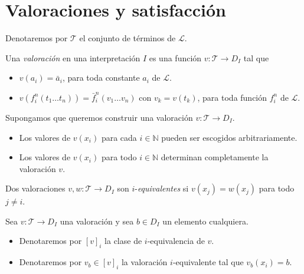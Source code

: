 \chapter{Valoraciones y satisfacción}

\begin{notation}
Denotaremos por $\mathscr T$ el conjunto de términos de $\mathscr L$.
\end{notation}

\begin{definition}
Una \textit{valoración} en una interpretación $I$ es una función $v : \mathscr T \to D_I$ tal que
\begin{itemize}
    \item $v(a_i) = \bar a_i$, para toda constante $a_i$ de $\mathscr L$.
    \item $v(f_i^n(t_1 \dots t_n)) = \bar f_i^n(v_1 \dots v_n)$ con $v_k = v(t_k)$, para toda función $f_i^n$ de $\mathscr L$.
\end{itemize}
\end{definition}

\begin{remarks}
Supongamos que queremos construir una valoración $v : \mathscr T \to D_I$.
\begin{itemize}
    \item Los valores de $v(x_i)$ para cada $i \in \mathbb N$ pueden ser escogidos arbitrariamente.
    \item Los valores de $v(x_i)$ para todo $i \in \mathbb N$ determinan completamente la valoración $v$.
\end{itemize}
\end{remarks}

\begin{definition}
Dos valoraciones $v, w : \mathscr T \to D_I$ son $i$-\textit{equivalentes} si $v(x_j) = w(x_j)$ para todo $j \ne i$.
\end{definition}

\begin{notation}
Sea $v : \mathscr T \to D_I$ una valoración y sea $b \in D_I$ un elemento cualquiera.

\begin{itemize}
    \item Denotaremos por $[v]_i$ la clase de $i$-equivalencia de $v$.
    \item Denotaremos por $v_b \in [v]_i$ la valoración $i$-equivalente tal que $v_b(x_i) = b$.
\end{itemize}
\end{notation}


